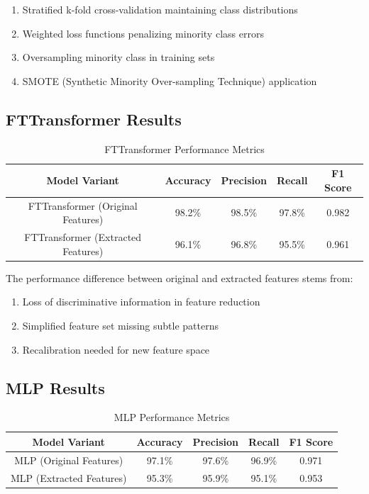 \documentclass[12pt,a4paper,twoside]{report}
\begin{document}
\begin{enumerate}
    \item Stratified k-fold cross-validation maintaining class distributions
    \item Weighted loss functions penalizing minority class errors
    \item Oversampling minority class in training sets
    \item SMOTE (Synthetic Minority Over-sampling Technique) application
\end{enumerate}

\subsection{FTTransformer Results}

\begin{table}[H]
    \centering
    \begin{tabular}{|c|c|c|c|c|}
        \hline
        \textbf{Model Variant} & \textbf{Accuracy} & \textbf{Precision} & \textbf{Recall} & \textbf{F1 Score} \\
        \hline
        FTTransformer (Original Features) & 98.2\% & 98.5\% & 97.8\% & 0.982 \\
        \hline
        FTTransformer (Extracted Features) & 96.1\% & 96.8\% & 95.5\% & 0.961 \\
        \hline
    \end{tabular}
    \caption{FTTransformer Performance Metrics}
\end{table}

The performance difference between original and extracted features stems from:

\begin{enumerate}
    \item Loss of discriminative information in feature reduction
    \item Simplified feature set missing subtle patterns
    \item Recalibration needed for new feature space
\end{enumerate}

\subsection{MLP Results}

\begin{table}[H]
    \centering
    \begin{tabular}{|c|c|c|c|c|}
        \hline
        \textbf{Model Variant} & \textbf{Accuracy} & \textbf{Precision} & \textbf{Recall} & \textbf{F1 Score} \\
        \hline
        MLP (Original Features) & 97.1\% & 97.6\% & 96.9\% & 0.971 \\
        \hline
        MLP (Extracted Features) & 95.3\% & 95.9\% & 95.1\% & 0.953 \\
        \hline
    \end{tabular}
    \caption{MLP Performance Metrics}
\end{table}
\end{document}
